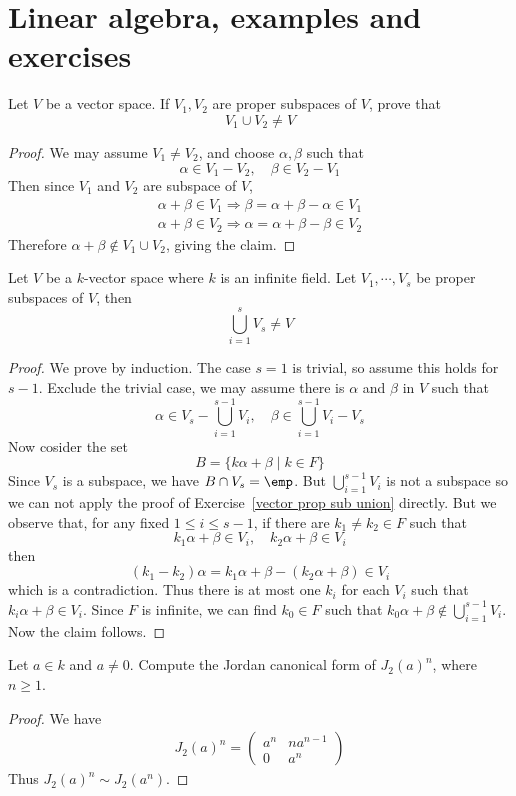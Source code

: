 \chapter{Linear algebra, examples and exercises}
\begin{exercise}\label{vector prop sub union}
Let $V$ be a vector space. If $V_1,V_2$ are proper subspaces of $V$, prove that
\[V_1\cup V_2\neq V\]
\end{exercise}
\begin{proof}
We may assume $V_1\neq V_2$, and choose $\alpha,\beta$ such that
\[\alpha\in V_1-V_2,\quad \beta\in V_2-V_1\]
Then since $V_1$ and $V_2$ are subspace of $V$,
\[\begin{array}{l}
\alpha+\beta\in V_1\Rightarrow \beta=\alpha+\beta-\alpha\in V_1\\
\alpha+\beta\in V_2\Rightarrow \alpha=\alpha+\beta-\beta\in V_2
\end{array}\]
Therefore $\alpha+\beta\notin V_1\cup V_2$, giving the claim.
\end{proof}
\begin{exercise}
Let $V$ be a $k$-vector space where $k$ is an infinite field. Let $V_1,\cdots,V_s$ be proper subspaces of $V$, then
\[\bigcup_{i=1}^{s}V_s\neq V\]
\end{exercise}
\begin{proof}
We prove by induction. The case $s=1$ is trivial, so assume this holds for $s-1$. Exclude the trivial case, we may assume there is $\alpha$ and $\beta$ in $V$ such that
\[\alpha\in V_s-\bigcup_{i=1}^{s-1}V_i,\quad \beta\in \bigcup_{i=1}^{s-1}V_i-V_s\]
Now cosider the set
\[B=\{k\alpha+\beta\mid k\in F\}\]
Since $V_s$ is a subspace, we have $B\cap V_s=\emp$. But $\bigcup_{i=1}^{s-1}V_i$ is not a subspace so we can not apply the proof of Exercise~\ref{vector prop sub union} directly. But we observe that, for any fixed $1\leq i\leq s-1$, if there are $k_1\neq k_2\in F$ such that \[k_1\alpha+\beta\in V_i,\quad k_2\alpha+\beta\in V_i\]
then
\[(k_1-k_2)\alpha=k_1\alpha+\beta-(k_2\alpha+\beta)\in V_i\]
which is a contradiction. Thus there is at most one $k_i$ for each $V_i$ such that $k_i\alpha+\beta\in V_i$. Since $F$ is infinite, we can find $k_0\in F$ such that $k_0\alpha+\beta\notin\bigcup_{i=1}^{s-1}V_i$. Now the claim follows.
\end{proof}
\begin{exercise}
Let $a\in k$ and $a\neq 0$. Compute the Jordan canonical form of $J_2(a)^n$, where $n\geq 1$.
\end{exercise}
\begin{proof}
We have 
\begin{align*}
J_2(a)^n=\begin{pmatrix}
a^n&na^{n-1}\\
0&a^n
\end{pmatrix}
\end{align*}
Thus $J_2(a)^n\sim J_2(a^n)$.
\end{proof}
